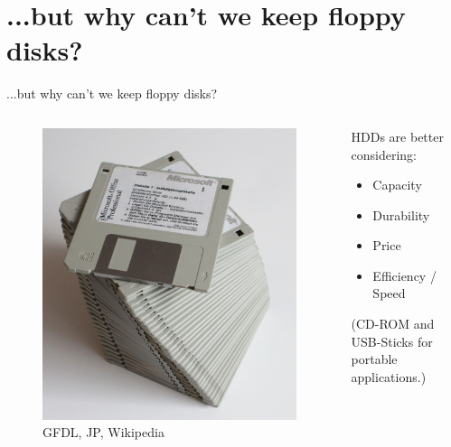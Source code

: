 \documentclass[12pt]{beamer}
\newlength{\wideitemsep}
\let\olditem\item
\renewcommand{\item}{\setlength{\itemsep}{\wideitemsep}\olditem}
\begin{document}
\section{...but why can't we keep floppy disks?}
\begin{frame}[fragile]{...but why can't we keep floppy disks?}
	
	 \begin{columns}[c]
	 	\begin{column}[c]{.5\textwidth}
	 		\begin{figure}[p]
	 			\centering
	 			\includegraphics[width=\linewidth]{img/floppy_ms_office_crop.jpg}
	 			\caption{GFDL, JP, Wikipedia}
	 		\end{figure}
	 	\end{column}
	 	\begin{column}[c]{.5\textwidth}
	 		HDDs are better considering:
	 		\begin{itemize}
	 			\item Capacity
	 			\item Durability
	 			\item Price
	 			\item Efficiency / Speed
	 		\end{itemize}
	 		
		 	\hfill
		 	
		 	(CD-ROM and USB-Sticks for portable applications.)
	 	\end{column}
	 \end{columns}
\end{frame}
\end{document}
